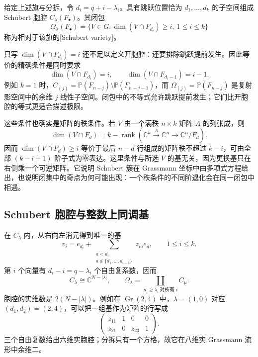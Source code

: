 \begin{definition}\label{g2:def:schubert-partition-locus}
	给定上述旗与分拆，令 \(d_i=q+i-\lambda_i\)。具有跳跃位置恰为 \(d_1,\ldots,d_k\) 的子空间组成 Schubert 胞腔 \(C_\lambda(F_\bullet)\)。其闭包
	\begin{equation}\label{g2:eq:schubert-rank-conditions}
		\Omega_\lambda(F_\bullet)=\{V\in G:\dim(V\cap F_{d_i})\ge i,\ 1\le i\le k\}
	\end{equation}
	称为相对于该旗的[Schubert variety]。
\end{definition}

只写 \(\dim(V\cap F_{d_i})=i\) 还不足以定义开胞腔：还要排除跳跃提前发生。因此等价的精确条件是同时要求
\[
	\dim(V\cap F_{d_i})=i,\qquad\dim(V\cap F_{d_i-1})=i-1.
\]
例如 \(k=1\) 时，\(C_{(j)}=\mathbb P(F_{n-j})\setminus\mathbb P(F_{n-j-1})\)，而 \(\Omega_{(j)}=\mathbb P(F_{n-j})\) 是复射影空间中的余维 \(j\) 线性子空间。闭包中的不等式允许跳跃提前发生；它们比开胞腔的等式更适合描述极限。

\ProseParagraphBreak

这些条件也确实是矩阵的秩条件。若 \(V\) 由一个满秩 \(n\times k\) 矩阵 \(A\) 的列张成，则
\[
	\dim(V\cap F_d)=k-\operatorname{rank}(\mathbb C^k\xrightarrow{A}\mathbb C^n\longrightarrow\mathbb C^n/F_d).
\]
因而 \(\dim(V\cap F_d)\ge i\) 等价于最后 \(n-d\) 行组成的矩阵秩不超过 \(k-i\)，可由全部 \((k-i+1)\) 阶子式为零表达。这里条件与所选 \(V\) 的基无关，因为更换基只在右侧乘一个可逆矩阵。它说明 Schubert 簇在 Grassmann 坐标中由多项式方程给出，也说明闭集中的奇点为何可能出现：一个秩条件的不同阶退化会在同一闭包中相遇。

\subsection{Schubert 胞腔与整数上同调基}
\label{g2:subsec:2105:02}
在 \(C_\lambda\) 内，从右向左消元得到唯一的基
\begin{equation}\label{g2:eq:schubert-echelon-coordinates}
	v_i=e_{d_i}+\sum_{\substack{a<d_i\\a\notin\{d_1,\ldots,d_{i-1}\}}}z_{ia}e_a,
	\qquad 1\le i\le k.
\end{equation}
第 \(i\) 个向量有 \(d_i-i=q-\lambda_i\) 个自由复系数，因而
\[
	C_\lambda\cong\mathbb C^{N-|\lambda|},\qquad
	\Omega_\lambda=\coprod_{\mu_i\ge\lambda_i\ \text{对所有 }i}C_\mu.
\]
胞腔的实维数是 \(2(N-|\lambda|)\)。例如在 \(\operatorname{Gr}(2,4)\) 中，\(\lambda=(1,0)\) 对应 \((d_1,d_2)=(2,4)\)，可以把一组基作为矩阵的行写成
\[
	\begin{pmatrix}z_{11}&1&0&0\\z_{21}&0&z_{23}&1\end{pmatrix}.
\]
三个自由复数给出六维实胞腔；分拆只有一个方格，故它在八维实 Grassmann 流形中余维二。

